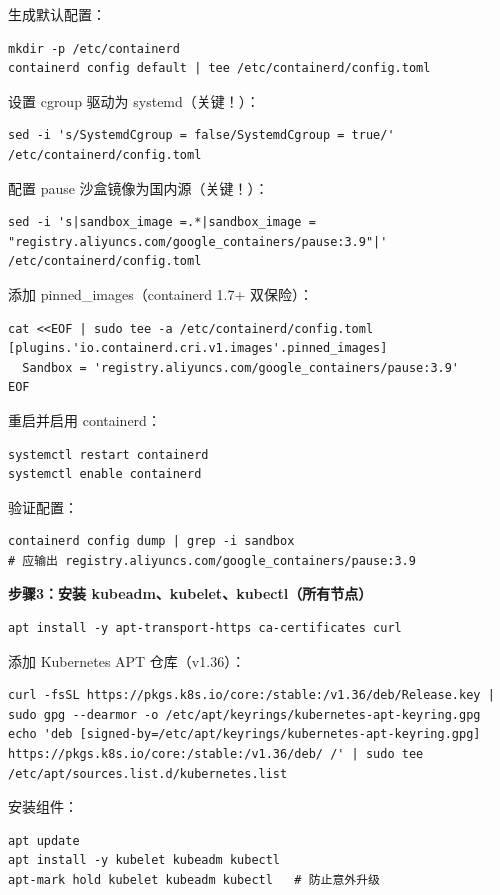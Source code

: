 \documentclass[12pt,UTF8]{ctexbook}
\begin{document}
生成默认配置：
\begin{lstlisting}
mkdir -p /etc/containerd
containerd config default | tee /etc/containerd/config.toml
\end{lstlisting}

设置 cgroup 驱动为 systemd（关键！）：
\begin{lstlisting}
sed -i 's/SystemdCgroup = false/SystemdCgroup = true/' /etc/containerd/config.toml
\end{lstlisting}

配置 pause 沙盒镜像为国内源（关键！）：
\begin{lstlisting}
sed -i 's|sandbox_image =.*|sandbox_image = "registry.aliyuncs.com/google_containers/pause:3.9"|' /etc/containerd/config.toml
\end{lstlisting}

添加 pinned\_images（containerd 1.7+ 双保险）：
\begin{lstlisting}
cat <<EOF | sudo tee -a /etc/containerd/config.toml
[plugins.'io.containerd.cri.v1.images'.pinned_images]
  Sandbox = 'registry.aliyuncs.com/google_containers/pause:3.9'
EOF
\end{lstlisting}

重启并启用 containerd：
\begin{lstlisting}
systemctl restart containerd
systemctl enable containerd
\end{lstlisting}

验证配置：
\begin{lstlisting}
containerd config dump | grep -i sandbox
# 应输出 registry.aliyuncs.com/google_containers/pause:3.9
\end{lstlisting}

\textbf{步骤3：安装 kubeadm、kubelet、kubectl（所有节点）}

\begin{lstlisting}
apt install -y apt-transport-https ca-certificates curl
\end{lstlisting}

添加 Kubernetes APT 仓库（v1.36）：
\begin{lstlisting}
curl -fsSL https://pkgs.k8s.io/core:/stable:/v1.36/deb/Release.key | sudo gpg --dearmor -o /etc/apt/keyrings/kubernetes-apt-keyring.gpg
echo 'deb [signed-by=/etc/apt/keyrings/kubernetes-apt-keyring.gpg] https://pkgs.k8s.io/core:/stable:/v1.36/deb/ /' | sudo tee /etc/apt/sources.list.d/kubernetes.list
\end{lstlisting}

安装组件：
\begin{lstlisting}
apt update
apt install -y kubelet kubeadm kubectl
apt-mark hold kubelet kubeadm kubectl   # 防止意外升级
\end{lstlisting}
\end{document}
